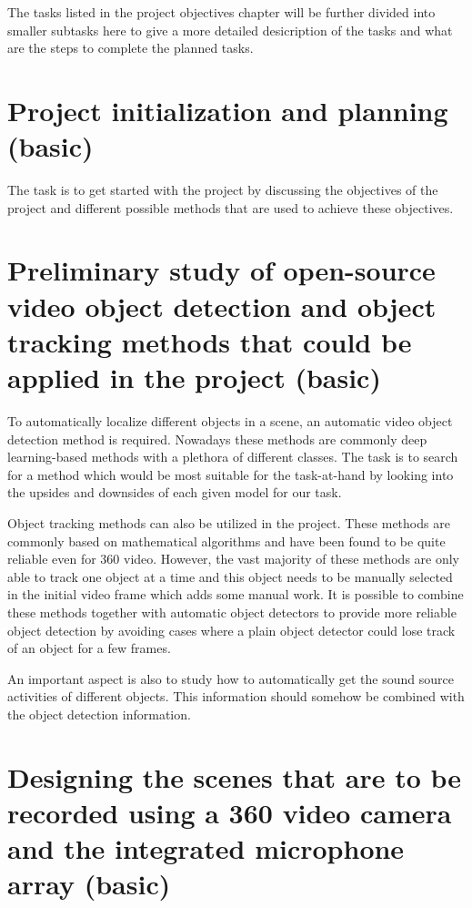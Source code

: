 The tasks listed in the project objectives chapter will be further divided into smaller subtasks here to give a more detailed desicription of the tasks and what are the steps to complete the planned tasks. 

\section{Project initialization and planning (basic)}

The task is to get started with the project by discussing the objectives of the project and different possible
methods that are used to achieve these objectives.

\section{Preliminary study of open-source video object detection and object tracking methods that could be applied in the project (basic)}

To automatically localize different objects in a scene, an automatic video object detection method is required.
Nowadays these methods are commonly deep learning-based methods with a plethora of different classes. The task is
to search for a method which would be most suitable for the task-at-hand by looking into the upsides and downsides
of each given model for our task.

Object tracking methods can also be utilized in the project. These methods are commonly based on mathematical 
algorithms and have been found to be quite reliable even for 360 video. However, the vast majority of these 
methods are only able to track one object at a time and this object needs to be manually selected in the initial
video frame which adds some manual work. It is possible to combine these methods together with automatic object
detectors to provide more reliable object detection by avoiding cases where a plain object detector could lose
track of an object for a few frames.

An important aspect is also to study how to automatically get the sound source activities of different objects.
This information should somehow be combined with the object detection information.

\section{Designing the scenes that are to be recorded using a 360 video camera and the integrated microphone array (basic)}

